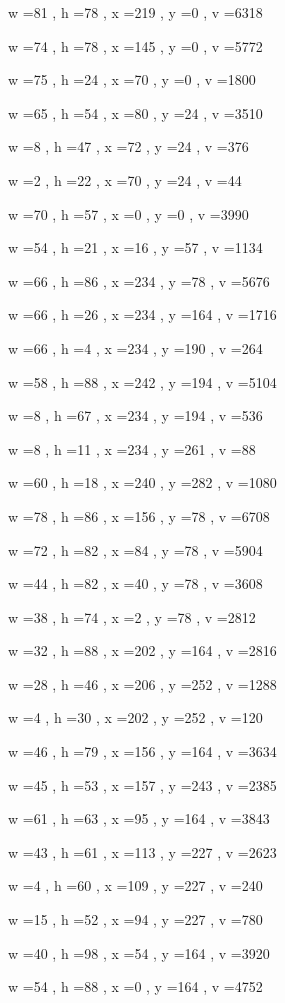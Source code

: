 \documentclass[11pt]{article}
\begin{document}
w =81 , h =78 , x =219 , y =0 , v =6318
\par
w =74 , h =78 , x =145 , y =0 , v =5772
\par
w =75 , h =24 , x =70 , y =0 , v =1800
\par
w =65 , h =54 , x =80 , y =24 , v =3510
\par
w =8 , h =47 , x =72 , y =24 , v =376
\par
w =2 , h =22 , x =70 , y =24 , v =44
\par
w =70 , h =57 , x =0 , y =0 , v =3990
\par
w =54 , h =21 , x =16 , y =57 , v =1134
\par
w =66 , h =86 , x =234 , y =78 , v =5676
\par
w =66 , h =26 , x =234 , y =164 , v =1716
\par
w =66 , h =4 , x =234 , y =190 , v =264
\par
w =58 , h =88 , x =242 , y =194 , v =5104
\par
w =8 , h =67 , x =234 , y =194 , v =536
\par
w =8 , h =11 , x =234 , y =261 , v =88
\par
w =60 , h =18 , x =240 , y =282 , v =1080
\par
w =78 , h =86 , x =156 , y =78 , v =6708
\par
w =72 , h =82 , x =84 , y =78 , v =5904
\par
w =44 , h =82 , x =40 , y =78 , v =3608
\par
w =38 , h =74 , x =2 , y =78 , v =2812
\par
w =32 , h =88 , x =202 , y =164 , v =2816
\par
w =28 , h =46 , x =206 , y =252 , v =1288
\par
w =4 , h =30 , x =202 , y =252 , v =120
\par
w =46 , h =79 , x =156 , y =164 , v =3634
\par
w =45 , h =53 , x =157 , y =243 , v =2385
\par
w =61 , h =63 , x =95 , y =164 , v =3843
\par
w =43 , h =61 , x =113 , y =227 , v =2623
\par
w =4 , h =60 , x =109 , y =227 , v =240
\par
w =15 , h =52 , x =94 , y =227 , v =780
\par
w =40 , h =98 , x =54 , y =164 , v =3920
\par
w =54 , h =88 , x =0 , y =164 , v =4752
\par
\newpage
\end{document}
